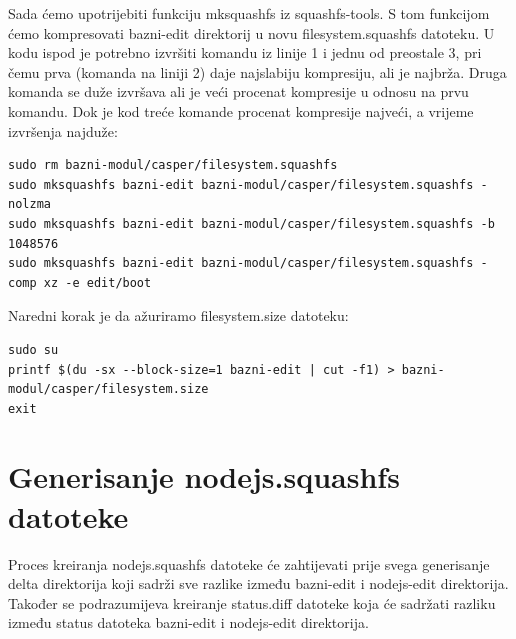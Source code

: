 \documentclass[12pt,vi]{mitthesis}
\begin{document}
\noindent
Sada ćemo upotrijebiti funkciju mksquashfs iz squashfs-tools. S tom funkcijom ćemo kompresovati bazni-edit direktorij u novu filesystem.squashfs datoteku. U kodu ispod je potrebno izvršiti komandu iz linije 1 i jednu od preostale 3, pri čemu prva (komanda na liniji 2) daje najslabiju kompresiju, ali je najbrža. Druga komanda se duže izvršava ali je veći procenat kompresije u odnosu na prvu komandu. Dok je kod treće komande procenat kompresije najveći, a vrijeme izvršenja najduže:
\begin{lstlisting}[style=BashInputStyle]
sudo rm bazni-modul/casper/filesystem.squashfs
sudo mksquashfs bazni-edit bazni-modul/casper/filesystem.squashfs -nolzma 
sudo mksquashfs bazni-edit bazni-modul/casper/filesystem.squashfs -b 1048576
sudo mksquashfs bazni-edit bazni-modul/casper/filesystem.squashfs -comp xz -e edit/boot
\end{lstlisting}

\noindent
Naredni korak je da ažuriramo filesystem.size datoteku:
\begin{lstlisting}[style=BashInputStyle]
sudo su
printf $(du -sx --block-size=1 bazni-edit | cut -f1) > bazni-modul/casper/filesystem.size
exit
\end{lstlisting}

\section*{Generisanje nodejs.squashfs datoteke}
\indent
Proces kreiranja nodejs.squashfs datoteke će zahtijevati prije svega generisanje delta direktorija koji sadrži sve razlike između bazni-edit i nodejs-edit direktorija. Također se podrazumijeva kreiranje status.diff datoteke koja će sadržati razliku između status datoteka bazni-edit i nodejs-edit direktorija.\\
\end{document}
